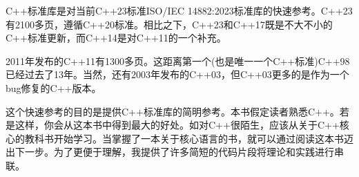 C++标准库是对当前C++23标准ISO/IEC 14882:2023标准库的快速参考。C++23有2100多页，遵循C++20标准。相比之下，C++23和C++17既是不大不小的C++标准更新，而C++14是对C++11的一个补充。

2011年发布的C++11有1300多页。这距离第一个(也是唯一一个C++标准)C++98已经过去了13年。当然，还有2003年发布的C++03，但C++03更多的是作为一个bug修复的C++版本。

这个快速参考的目的是提供C++标准库的简明参考。本书假定读者熟悉C++。若是这样，你会从这本书中得到最大的好处。如对C++很陌生，应该从关于C++核心的教科书开始学习。当掌握了一本关于核心语言的书，就可以通过阅读这本书迈出下一步。为了更便于理解，我提供了许多简短的代码片段将理论和实践进行串联。